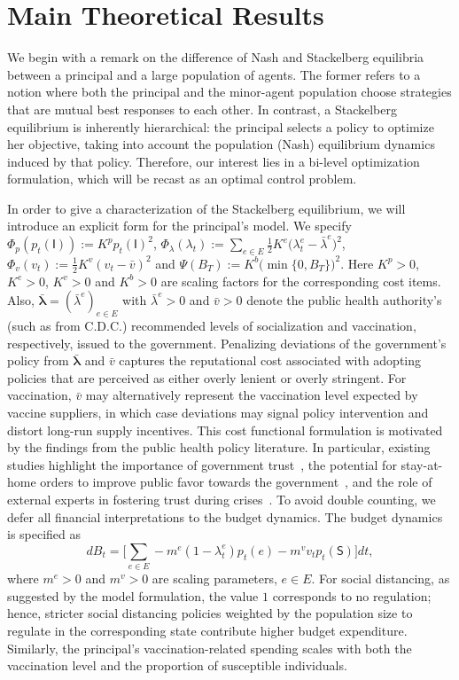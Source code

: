 \documentclass[letterpaper, 10 pt, conference]{ieeeconf}  %
\def\sS{\mathsf{S}}
\def\sI{\mathsf{I}}
\begin{document}
\section{Main Theoretical Results}
\label{sec:smfe_charac}
We begin with a remark on the difference of Nash and Stackelberg equilibria between a principal and a large population of agents. The former refers to a notion where both the principal and the minor-agent population choose strategies that are mutual best responses to each other. In contrast, a Stackelberg equilibrium is inherently hierarchical: the principal selects a policy to optimize her objective, taking into account the population (Nash) equilibrium dynamics induced by that policy. Therefore, our interest lies in a bi-level optimization formulation, which will be recast as an optimal control problem.


In order to give a characterization of the Stackelberg equilibrium, we will introduce an explicit form for the principal's model. We specify $\Phi_{p}(p_t(\sI)) := K^p p_t(\sI)^2$, $\Phi_\lambda(\lambda_t) := \sum_{e\in E}\frac12 K^e\bigl(\lambda_t^e-\bar\lambda^e\bigr)^2$, $\Phi_v(v_{t}) := \frac12 K^{v} (v_t - \bar{v})^2$ and $\Psi(B_T)
:= K^b \bigl(\min\{0,B_T\}\bigr)^2$. Here $K^p > 0$, $K^e > 0$, $K^v>0$ and $K^b>0$ are scaling factors for the corresponding cost items. Also, $\boldsymbol{\bar\lambda} = (\bar\lambda^e)_{e \in E}$ with $\bar\lambda^e > 0$ and $\bar{v} > 0$ denote the public health authority's (such as from C.D.C.) recommended levels of socialization and vaccination, respectively, issued to the government. Penalizing deviations of the government's policy from $\boldsymbol{\bar\lambda}$ and $\bar{v}$ captures the reputational cost associated with adopting policies that are perceived as either overly lenient or overly stringent. 
For vaccination, $\bar{v}$ may alternatively represent the vaccination level expected by vaccine suppliers, in which case deviations may signal policy intervention and distort long-run supply incentives. This cost functional formulation is motivated by the findings from the public health policy literature. In particular, existing studies highlight the importance of government trust~\cite{Han2021Trust}, the potential for stay-at-home orders to improve public favor towards the government~\cite{Nelson2020Gov}, and the role of external experts in fostering trust during crises~\cite{Broekema2018Crisis}.
To avoid double counting, we defer all financial interpretations to the budget dynamics.
The budget dynamics is specified as
\begin{equation}
\label{eq:budget_spec}
dB_t
=
\big[
\sum_{e\in E} - m^e(1 - \lambda_t^e) p_t(e)
- m^{v} v_t p_t(\sS)
\big]dt,
\end{equation}
where $m^e > 0$ and $m^v > 0$ are scaling parameters, $e \in E$. For social distancing, as suggested by the model formulation, the value $1$ corresponds to no regulation; hence, stricter social distancing policies weighted by the population size to regulate in the corresponding state contribute higher budget expenditure. Similarly, the principal's vaccination-related spending scales with both the vaccination level and the proportion of susceptible individuals.
\end{document}
